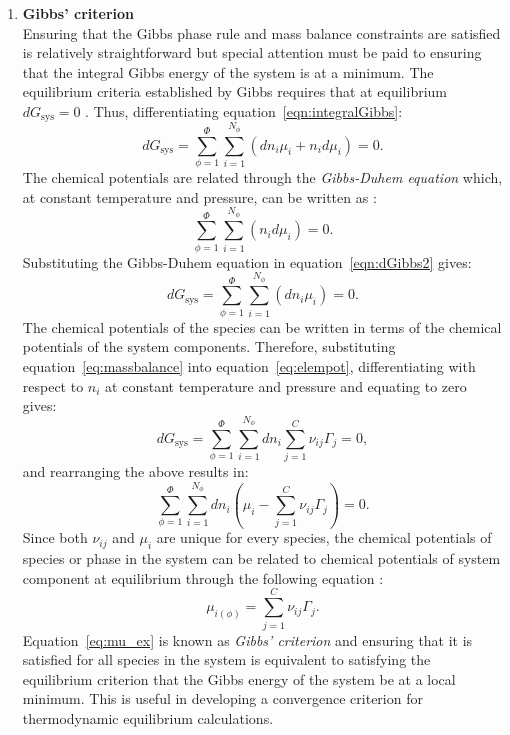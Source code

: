 \begin{enumerate}
		\item \textbf{Gibbs' criterion}\\
			Ensuring that the Gibbs phase rule and mass balance constraints are satisfied is relatively straightforward but special attention must be paid to ensuring that the integral Gibbs energy of the system is at a minimum. The equilibrium criteria established by Gibbs requires that at equilibrium $d G_\text{sys} = 0$ \cite{Gibbs:1878aa}. Thus, differentiating equation~\eqref{eqn:integralGibbs}:
			\begin{equation}\label{eqn:dGibbs1}
				d G_{\text{sys}} = \sum_{\phi=1}^{\Phi} \sum_{i=1}^{N_{\phi}} \left( d n_{i}\mu_{i} + n_{i} d \mu_{i}\right) = 0.
			\end{equation}
			The chemical potentials are related through the \emph{Gibbs-Duhem equation} which, at constant temperature and pressure, can be written as \cite{Olander08}:
			\begin{equation}\label{eqn:dGibbs2}
				\sum_{\phi=1}^{\Phi} \sum_{i=1}^{N_{\phi}} \left( n_{i} d \mu_{i}\right) = 0.
			\end{equation}
			Substituting the Gibbs-Duhem equation in equation~\eqref{eqn:dGibbs2} gives:
			\begin{equation}\label{eqn:dGibbs3}
				d G_{\text{sys}} = \sum_{\phi=1}^{\Phi} \sum_{i=1}^{N_{\phi}} \left( d n_{i}\mu_{i} \right) = 0.
			\end{equation}
			The chemical potentials of the species can be written in terms of the chemical potentials of the system components. Therefore, substituting equation~\eqref{eq:massbalance} into equation~\eqref{eq:elempot}, differentiating with respect to $n_{i}$ at constant temperature and pressure and equating to zero gives:
			\begin{equation}\label{eqn:dGibbs4}
				d G_{\text{sys}} = \sum_{\phi=1}^{\Phi} \sum_{i=1}^{N_{\phi}}  d n_{i}\sum_{j=1}^{C}\nu_{ij}\Gamma_j  = 0,
			\end{equation}
			and rearranging the above results in:
			\begin{equation}\label{eqn:dGibbs5}
				\sum_{\phi=1}^{\Phi} \sum_{i=1}^{N_{\phi}}  d n_{i} \left( \mu_{i} - \sum_{j=1}^{C}\nu_{ij}\Gamma_j \right) = 0.
			\end{equation}
		Since both $\nu_{ij}$ and $\mu_{i}$ are unique for every species, the chemical potentials of species or phase in the system can be related to chemical potentials of system component at equilibrium through the following equation \cite{vanZeggeren11}:
		\begin{equation}\label{eq:Gibbs_criterion}
			\mu_{i(\phi)} = \sum_{j=1}^{C}\nu_{ij}\Gamma_j.
		\end{equation}
		Equation~\eqref{eq:mu_ex} is known as \emph{Gibbs' criterion} and ensuring that it is satisfied for all species in the system is equivalent to satisfying the equilibrium criterion that the Gibbs energy of the system be at a local minimum. This is useful in developing a convergence criterion for thermodynamic equilibrium calculations.
	\end{enumerate}	
	
